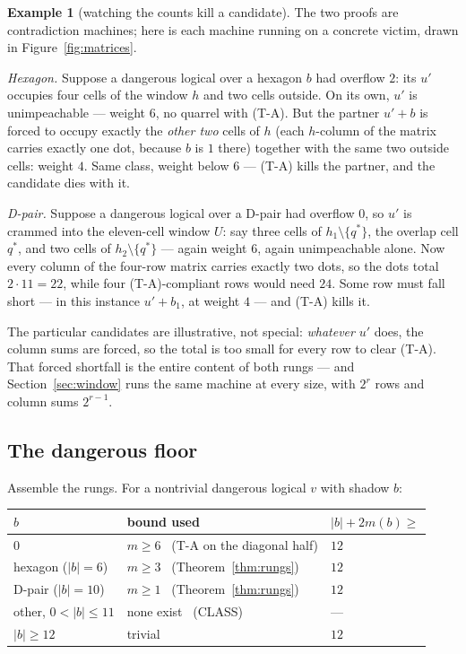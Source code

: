 \documentclass[11pt]{article}
\theoremstyle{plain}
\theoremstyle{definition}
\newtheorem{example}[theorem]{Example}
\theoremstyle{remark}
\newcommand{\wt}[1]{\lvert #1\rvert}
\begin{document}
\begin{example}[watching the counts kill a candidate]\label{ex:counts}
The two proofs are contradiction machines; here is each machine running on
a concrete victim, drawn in Figure~\ref{fig:matrices}.

\emph{Hexagon.} Suppose a dangerous logical over a hexagon $b$ had
overflow $2$: its $u'$ occupies four cells of the window $h$ and two cells
outside. On its own, $u'$ is unimpeachable --- weight $6$, no quarrel with
(T-A). But the partner $u' + b$ is forced to occupy exactly the
\emph{other two} cells of $h$ (each $h$-column of the matrix carries
exactly one dot, because $b$ is $1$ there) together with the same two
outside cells: weight $4$. Same class, weight below $6$ --- (T-A) kills
the partner, and the candidate dies with it.

\emph{D-pair.} Suppose a dangerous logical over a D-pair had overflow $0$,
so $u'$ is crammed into the eleven-cell window $U$: say three cells of
$h_1 \setminus \{q^*\}$, the overlap cell $q^*$, and two cells of
$h_2 \setminus \{q^*\}$ --- again weight $6$, again unimpeachable alone.
Now every column of the four-row matrix carries exactly two dots, so the
dots total $2 \cdot 11 = 22$, while four (T-A)-compliant rows would need
$24$. Some row must fall short --- in this instance $u' + b_1$, at weight
$4$ --- and (T-A) kills it.

The particular candidates are illustrative, not special: \emph{whatever}
$u'$ does, the column sums are forced, so the total is too small for every
row to clear (T-A). That forced shortfall is the entire content of both
rungs --- and Section~\ref{sec:window} runs the same machine at every
size, with $2^r$ rows and column sums $2^{r-1}$.
\end{example}

\subsection{The dangerous floor}

Assemble the rungs. For a nontrivial dangerous logical $v$ with shadow $b$:

\begin{center}
\begin{tabular}{lll}
\toprule
$b$ & bound used & $\wt{b} + 2m(b) \geq$\\
\midrule
$0$ & $m \geq 6$ \ (T-A on the diagonal half) & $12$\\
hexagon ($\wt b = 6$) & $m \geq 3$ \ (Theorem~\ref{thm:rungs}) & $12$\\
D-pair ($\wt b = 10$) & $m \geq 1$ \ (Theorem~\ref{thm:rungs}) & $12$\\
other, $0 < \wt b \leq 11$ & none exist \ (CLASS) & ---\\
$\wt b \geq 12$ & trivial & $12$\\
\bottomrule
\end{tabular}
\end{center}
\end{document}
